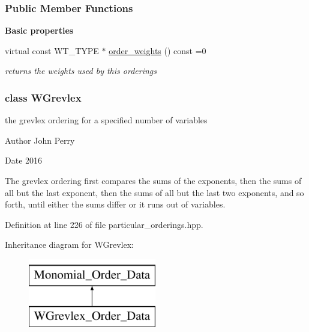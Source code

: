 \subsubsection*{Public Member Functions}
\begin{Indent}\textbf{ Basic properties}\par
\begin{DoxyCompactItemize}
\item 
\mbox{\label{group__orderinggroup_a5916f1631d5c30fe39dedcef96a3944e}} 
virtual const W\+T\+\_\+\+T\+Y\+PE $\ast$ \hyperlink{group__orderinggroup_a5916f1631d5c30fe39dedcef96a3944e}{order\+\_\+weights} () const =0
\begin{DoxyCompactList}\small\item\em returns the weights used by this orderings \end{DoxyCompactList}\end{DoxyCompactItemize}
\end{Indent}
\label{class_w_grevlex}
\subsubsection{class W\+Grevlex}
the grevlex ordering for a specified number of variables 

\begin{DoxyAuthor}{Author}
John Perry 
\end{DoxyAuthor}
\begin{DoxyDate}{Date}
2016
\end{DoxyDate}
The grevlex ordering first compares the sums of the exponents, then the sums of all but the last exponent, then the sums of all but the last two exponents, and so forth, until either the sums differ or it runs out of variables. 

Definition at line 226 of file particular\+\_\+orderings.\+hpp.

Inheritance diagram for W\+Grevlex\+:\begin{figure}[H]
\begin{center}
\leavevmode
\includegraphics[height=3.000000cm]{group__orderinggroup}
\end{center}
\end{figure}

